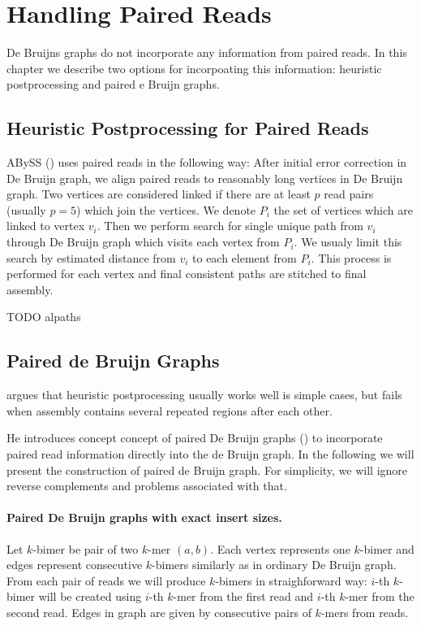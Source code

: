 \section{Handling Paired Reads}

De Bruijns graphs do not incorporate any information from paired reads.
In this chapter we describe two options for incorpoating this information:
heuristic postprocessing and paired e Bruijn graphs.

\subsection{Heuristic Postprocessing for Paired Reads}

ABySS (\cite{Abyss}) uses paired reads in the following way:
After initial error correction in De Bruijn graph, we align paired reads
to reasonably long vertices in De Bruijn graph. Two vertices are considered linked
if there are at least $p$ read pairs (usually $p=5$) which join the vertices.
We denote $P_i$ the set of vertices which are linked to vertex $v_i$.
Then we perform search for single unique path from $v_i$ through De Bruijn graph which visits
each vertex from $P_i$. We usualy limit this search by estimated distance from $v_i$ to each element
from $P_i$. This process is performed for each vertex and final consistent paths are stitched to final assembly.

TODO alpaths

\subsection{Paired de Bruijn Graphs}

\citet{Paired} argues that heuristic postprocessing
usually works well is simple cases, but fails when assembly contains
several repeated regions after each other.

He introduces concept concept of paired De Bruijn graphs (\cite{Paired}) to incorporate paired read
information directly into the de Bruijn graph.
In the following we will present the construction of 
paired de Bruijn graph.
For simplicity, we will ignore reverse complements and problems associated with that.

\paragraph{Paired De Bruijn graphs with exact insert sizes.}
Let $k$-bimer be pair of two $k$-mer $(a, b)$. Each vertex represents one $k$-bimer and edges represent
consecutive $k$-bimers similarly as in ordinary De Bruijn graph. 
From each pair of reads we will produce $k$-bimers in straighforward way:
$i$-th $k$-bimer will be created using $i$-th $k$-mer from the first read and $i$-th $k$-mer from the second read.
Edges in graph are given by consecutive pairs of $k$-mers from reads.


